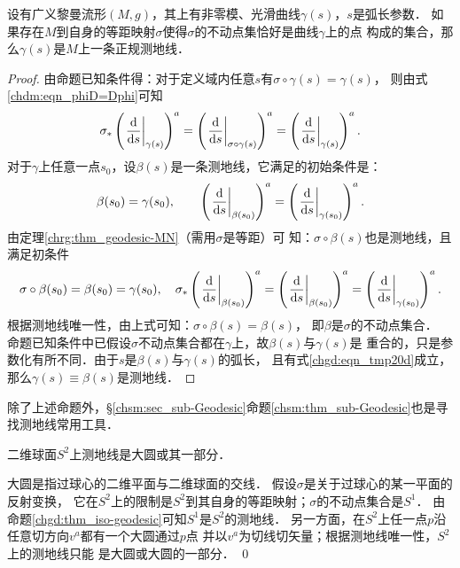 \begin{proposition}\label{chgd:thm_iso-geodesic}
    设有广义黎曼流形$(M,g)$，其上有非零模、光滑曲线$\gamma(s)$，$s$是弧长参数．
    如果存在$M$到自身的等距映射$\sigma$使得$\sigma$的不动点集恰好是曲线$\gamma$上的点
    构成的集合，那么$\gamma(s)$是$M$上一条正规测地线．
\end{proposition}
\begin{proof}
    由命题已知条件得：对于定义域内任意$s$有$\sigma\circ \gamma(s) = \gamma(s)$，
    则由式\eqref{chdm:eqn_phiD=Dphi}可知
    \begin{equation}
        \sigma_{*}\left(\left.\frac{{\rm d}  }{{\rm d} s}\right|_{\gamma(s)}\right)^a
        = \left(\left.\frac{{\rm d}  }{{\rm d} s}\right|_{\sigma\circ\gamma(s)}\right)^a
        = \left(\left.\frac{{\rm d}  }{{\rm d} s}\right|_{\gamma(s)}\right)^a .
    \end{equation}
    对于$\gamma$上任意一点$s_0$，设$\beta(s)$是一条测地线，它满足的初始条件是：
    \begin{equation}\label{chgd:eqn_tmp20d}
        \beta(s_0)=\gamma(s_0),\qquad 
        \left(\left.\frac{{\rm d}  }{{\rm d} s}\right|_{\beta(s_0)}\right)^a
        =\left(\left.\frac{{\rm d}  }{{\rm d} s}\right|_{\gamma(s_0)}\right)^a .
    \end{equation}
    由定理\ref{chrg:thm_geodesic-MN}（需用$\sigma$是等距）可
    知：$\sigma\circ \beta(s)$也是测地线，且满足初条件
    \begin{equation*}
        \sigma\circ\beta(s_0)=\beta(s_0)=\gamma(s_0),\quad
        \sigma_* \left(\left.\frac{{\rm d}  }{{\rm d} s}\right|_{\beta(s_0)}\right)^a
        =\left(\left.\frac{{\rm d}  }{{\rm d} s}\right|_{\beta(s_0)}\right)^a
        =\left(\left.\frac{{\rm d}  }{{\rm d} s}\right|_{\gamma(s_0)}\right)^a .
    \end{equation*}
    根据测地线唯一性，由上式可知：$\sigma\circ \beta(s) = \beta(s)$，
    即$\beta$是$\sigma$的不动点集合．
    命题已知条件中已假设$\sigma$不动点集合都在$\gamma$上，故$\beta(s)$与$\gamma(s)$是
    重合的，只是参数化有所不同．由于$s$是$\beta(s)$与$\gamma(s)$的弧长，
    且有式\eqref{chgd:eqn_tmp20d}成立，那么$\gamma(s)\equiv \beta(s)$是测地线．
\end{proof}


除了上述命题外，\S\ref{chsm:sec_sub-Geodesic}命题\ref{chsm:thm_sub-Geodesic}也是寻找测地线常用工具．


\begin{example}
    二维球面$S^2$上测地线是大圆或其一部分．
\end{example}
大圆是指过球心的二维平面与二维球面的交线．
假设$\sigma$是关于过球心的某一平面的反射变换，
它在$S^2$上的限制是$S^2$到其自身的等距映射；$\sigma$的不动点集合是$S^1$．
由命题\ref{chgd:thm_iso-geodesic}可知$S^1$是$S^2$的测地线．
另一方面，在$S^2$上任一点$p$沿任意切方向$v^a$都有一个大圆通过$p$点
并以$v^a$为切线切矢量；根据测地线唯一性，$S^2$上的测地线只能
是大圆或大圆的一部分．
\qed


